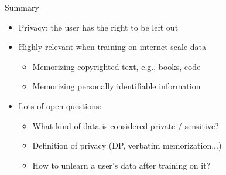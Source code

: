 \documentclass[usenames,dvipsnames,notes,11pt,aspectratio=169,hyperref={colorlinks=true, linkcolor=blue}]{beamer}
\begin{document}

\begin{frame}
    {Summary}
    \begin{itemize}
        \item Privacy: the user has the right to be left out
        \item Highly relevant when training on internet-scale data
            \begin{itemize}
                \item Memorizing copyrighted text, e.g., books, code
                \item Memorizing personally identifiable information
            \end{itemize}
        \item Lots of open questions:
            \begin{itemize}
                \item What kind of data is considered private / sensitive?
                \item Definition of privacy (DP, verbatim memorization...)
                \item How to unlearn a user's data after training on it? 
            \end{itemize}
    \end{itemize}
\end{frame}
\end{document}

